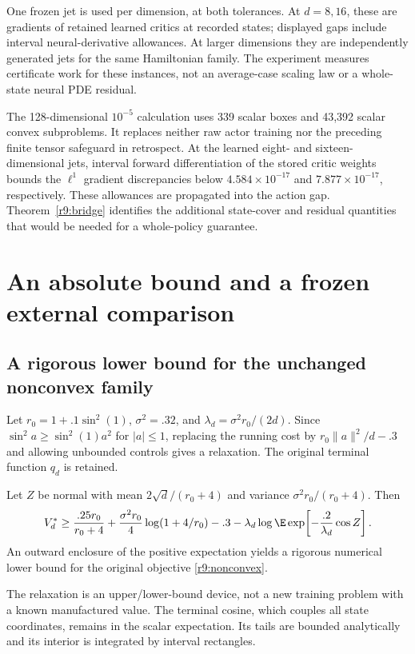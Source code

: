 \begin{table}[t]
\centering\small
\caption{Executed continuous-action certificates}\label{r9:tab:action}

\par\smallskip\footnotesize One frozen jet is used per dimension, at both tolerances. At $d=8,16$, these are gradients of retained learned critics at recorded states; displayed gaps include interval neural-derivative allowances. At larger dimensions they are independently generated jets for the same Hamiltonian family. The experiment measures certificate work for these instances, not an average-case scaling law or a whole-state neural PDE residual.
\end{table}

The 128-dimensional $10^{-5}$ calculation uses 339 scalar boxes and 43,392 scalar convex subproblems. It replaces neither raw actor training nor the preceding finite tensor safeguard in retrospect. At the learned eight- and sixteen-dimensional jets, interval forward differentiation of the stored critic weights bounds the $\ell^1$ gradient discrepancies below $4.584\times10^{-17}$ and $7.877\times10^{-17}$, respectively. These allowances are propagated into the action gap. Theorem~\ref{r9:bridge} identifies the additional state-cover and residual quantities that would be needed for a whole-policy guarantee.

\section{An absolute bound and a frozen external comparison}\label{r9:external}
\subsection{A rigorous lower bound for the unchanged nonconvex family}
Let $r_0=1+.1\sin^2(1)$, $\sigma^2=.32$, and $\lambda_d=\sigma^2r_0/(2d)$. Since $\sin^2a\geq\sin^2(1)a^2$ for $|a|\leq1$, replacing the running cost by $r_0\|a\|^2/d-.3$ and allowing unbounded controls gives a relaxation. The original terminal function $q_d$ is retained.
\begin{proposition}\label{r9:lower}
Let $Z$ be normal with mean $2\sqrt d/(r_0+4)$ and variance $\sigma^2r_0/(r_0+4)$. Then
\begin{equation}
 V_d^*\geq
 \frac{.25r_0}{r_0+4}+\frac{\sigma^2r_0}{4}\log(1+4/r_0)-.3
 -\lambda_d\log\E\exp\!\left[-\frac{.2}{\lambda_d}\cos Z\right].\label{r9:lowerformula}
\end{equation}
An outward enclosure of the positive expectation yields a rigorous numerical lower bound for the original objective \eqref{r9:nonconvex}.
\end{proposition}
The relaxation is an upper/lower-bound device, not a new training problem with a known manufactured value. The terminal cosine, which couples all state coordinates, remains in the scalar expectation. Its tails are bounded analytically and its interior is integrated by interval rectangles.

